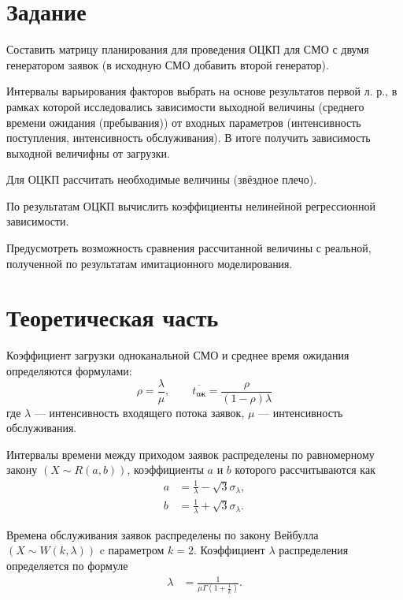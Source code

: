 \documentclass[a4paper, 14pt]{extreport}
\begin{document}


\begin{MainPart}

\section{Задание}

Составить матрицу планирования для проведения ОЦКП для СМО с двумя генератором заявок (в исходную СМО добавить второй генератор).

Интервалы варьирования факторов выбрать на основе результатов первой л. р., в рамках которой исследовались зависимости выходной величины (среднего времени ожидания (пребывания)) от входных параметров (интенсивность поступления, интенсивность обслуживания).
В итоге получить зависимость выходной величифны от загрузки.

Для ОЦКП рассчитать необходимые величины (звёздное плечо).

По результатам ОЦКП вычислить коэффициенты нелинейной регрессионной зависимости.

Предусмотреть возможность сравнения рассчитанной величины с реальной, полученной по результатам имитационного моделирования.

\section{Теоретическая часть}

Коэффициент загрузки одноканальной СМО и среднее время ожидания определяются формулами:
\begin{equation}
	\label{eqn:load-and-wait}
	\rho = \frac\lambda\mu, \qquad \overline{t_{\text{ож}}} = \frac{\rho}{(1 - \rho)\lambda}
\end{equation}
где $\lambda$ — интенсивность входящего потока заявок, $\mu$ — интенсивность обслуживания.

Интервалы времени между приходом заявок распределены по равномерному закону $(X \sim R(a, b))$, коэффициенты $a$ и $b$ которого рассчитываются как
\begin{equation}
	\begin{aligned}
		a &= \frac1\lambda - \sqrt{3}\sigma_\lambda, \\
		b &= \frac1\lambda + \sqrt{3}\sigma_\lambda.
	\end{aligned}
\end{equation}

Времена обслуживания заявок распределены по закону Вейбулла $(X \sim W(k, \lambda))$ c параметром $k = 2$.
Коэффициент $\lambda$ распределения определяется по формуле
\begin{equation}
	\begin{aligned}
		\lambda &= \frac{1}{\mu\Gamma{\left(1 + \frac1k\right)}}.
	\end{aligned}
\end{equation}


\end{MainPart}
\end{document}
